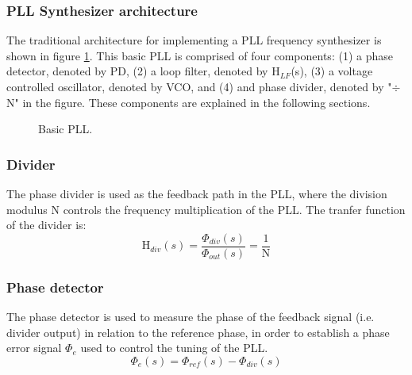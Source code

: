 		\subsubsection{PLL Synthesizer architecture}
			The traditional architecture for implementing a PLL frequency synthesizer \cite{Razavi1996DesignOM} is shown in figure \ref{fig:basic_pll}. This basic PLL is comprised of four components: (1) a phase detector, denoted by PD, (2) a loop filter, denoted by H$_{LF}$(s), (3) a voltage controlled oscillator, denoted by VCO, and (4) and phase divider, denoted by "$\div$ N" in the figure. These components are explained in the following sections.
			\begin{figure}[htb!]
				\center
				\caption{Basic PLL.}
				\label{fig:basic_pll}
			\end{figure}
			\FloatBarrier

		\subsubsection{Divider}
			The phase divider is used as the feedback path in the PLL, where the division modulus N controls the frequency multiplication of the PLL. The tranfer function of the divider is:
			\begin{equation}
				\mathrm{H}_{div}(s) = \frac{\Phi_{div}(s)}{\Phi_{out}(s)} = \frac{1}{\mathrm{N}}
			\end{equation}

			\subsubsection{Phase detector}
			The phase detector is used to measure the phase of the feedback signal (i.e. divider output) in relation to the reference phase, in order to establish a phase error signal $\Phi_e$ used to control the tuning of the PLL.
			\begin{equation}
				\Phi_e(s) = \Phi_{ref}(s) - \Phi_{div}(s)
			\end{equation}

